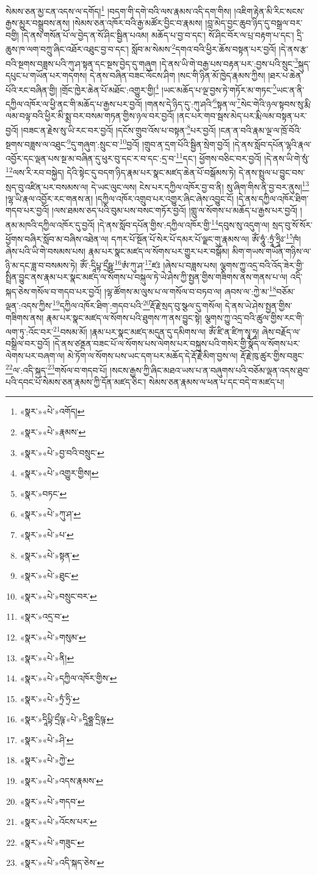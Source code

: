 སེམས་ཅན་མྱ་ངན་འདས་ལ་དགོད།\footnote{«སྣར་»«པེ་»འགོད།} །བདག་གི་དགེ་བའི་ལས་རྣམས་འདི་དག་གིས། །འཇིག་རྟེན་མི་རིང་སངས་རྒྱས་མྱུར་བསྒྲུབས་ནས། །སེམས་ཅན་འཁོར་བའི་རྒྱ་མཚོར་བྱིང་བ་རྣམས། །བླ་མེད་བྱང་ཆུབ་ཉིད་དུ་བསྒྲལ་བར་བགྱི། །དེ་ནས་གསོན་པོ་ལ་བྱེད་ན་སོ་ཤིང་སྦྱིན་པའམ། མཆོད་པ་བྱ་བ་དང་། སོ་ཤིང་བོར་ལ་པྲ་བརྟག་པ་དང་། དྲི་ཆུས་ཁ་ལག་བཀྲུ་ཞིང་འཐོར་འཐུང་བྱ་བ་དང་། སློབ་མ་སེམས་\footnote{«སྣར་»«པེ་»རྣམས་}དགའ་བའི་ཕྱིར་ཆོས་བསྟན་པར་བྱའོ། །དེ་ནས་རྩ་བའི་སྔགས་བཟླས་པའི་ཀུ་ཤ་སྟན་དང་སྔས་བྱེད་དུ་གཞུག །དེ་ནས་ཡི་གེ་བརྒྱ་པས་བརྟན་པར་:བྱས་པའི་སྲུང་\footnote{«སྣར་»«པེ་»བྱ་བའི་བསྲུང་}སྐུད་དཔུང་པ་གཡོན་པར་གདགས། དེ་ནས་བཞིན་བཟང་ལོངས་ཤིག །སང་གི་ཉིན་མོ་ཁྱེད་རྣམས་ཀྱིས། །ཐར་པ་ཆེན་པོའི་རང་བཞིན་གྱི། །གྲོང་ཁྱེར་ཆེན་པོ་མཐོང་:འགྱུར་གྱི།\footnote{«སྣར་»«པེ་»འགྱུར་གྱིས།} །ཡང་མཆོད་པ་ལྔ་བྱས་ཏེ་གཏོར་མ་གཏང་\footnote{«སྣར་»བཏང་}ཡང་ན་ནི་དཀྱིལ་འཁོར་ལ་ཕྱི་ནང་གི་མཆོད་པ་རྒྱས་པར་བྱའོ། །གནས་དེ་ཉིད་དུ་:ཀུ་ཤའི་\footnote{«སྣར་»«པེ་»ཀུ་ཤ་}སྟན་ལ་\footnote{«སྣར་»«པེ་»པ་}སེང་གེའི་ཉལ་སྟབས་སུ་རྨི་ལམ་བལྟ་བའི་ཕྱིར་མི་སྨྲ་བར་བསམ་གཏན་གྱིས་ཉལ་བར་བྱའོ། །ནང་པར་གབ་སྦས་མེད་པར་རྨི་ལམ་བསྟན་པར་བྱའོ། །བཟང་ན་རྗེས་སུ་ཡི་རང་བར་བྱའོ། །དངོས་གྲུབ་འོས་པ་བསྟན་\footnote{«སྣར་»«པེ་»སྟན་}པར་བྱའོ། །ངན་ན་བའི་རྣམ་ལྔ་ལ་ཁྲོ་བོའི་སྔགས་བཟླས་ལ་འཐུང་\footnote{«སྣར་»«པེ་»ཐུང་}དུ་གཞུག་:སྲུང་བ་\footnote{«སྣར་»«པེ་»བསྲུང་བར་}བྱའོ། །གྲུབ་ན་དྲག་པོའི་སྦྱིན་སྲེག་བྱའོ། །དེ་ནས་སློབ་དཔོན་ལྷའི་རྣལ་འབྱོར་དང་ལྡན་པས་སྔ་མ་བཞིན་དུ་ཕུར་བུ་དང་ར་བ་དང་:དྲ་བ་\footnote{«སྣར་»འདྲ་བ་}དང་། ཕྱོགས་བཅིང་བར་བྱའོ། །དེ་ནས་ཡི་གེ་སུཾ་\footnote{«སྣར་»«པེ་»གསུམ་}ལས་རི་རབ་བསྐྱེད། དེའི་སྟེང་དུ་བདག་ཉིད་རྣམ་པར་སྣང་མཛད་ཆེན་པོ་བསྒོམས་ཏེ། དེ་ནས་སྤྲུལ་པ་བྱུང་བས་སྲད་བུ་འཛིན་པར་བསམས་ལ། དེ་ཡང་ལུང་ལས། ངེས་པར་དཀྱིལ་འཁོར་བྱ་བ་ནི། སུ་ཞིག་གིས་ནི་བྱ་བར་ནུས།\footnote{«སྣར་»«པེ་»ནི།} །ལྷ་ཡི་རྣལ་འབྱོར་རང་གནས་ན། །དཀྱིལ་འཁོར་འགྲུབ་པར་འགྱུར་ཞིང་ཞེས་འབྱུང་ངོ། །དེ་ནས་དཀྱིལ་འཁོར་ཐིག་གདབ་པར་བྱའོ། །ལས་ཐམས་ཅད་པའི་བུམ་པས་བསང་གཏོར་བྱའོ། །གླུ་ལ་སོགས་པ་མཆོད་པ་རྒྱས་པར་བྱའོ། །ནམ་མཁའི་དཀྱིལ་འཁོར་དུ་བྱའོ། །དེ་ནས་སློབ་དཔོན་གྱིས་:དཀྱིལ་འཁོར་གྱི་\footnote{«སྣར་»«པེ་»དཀྱིལ་འཁོར་གྱིས་}དབུས་སུ་འདུག་ལ། སྲད་བུ་སོ་སོར་ཕྱོགས་བཞིར་སློབ་མ་བཞིས་འཐེན་ལ། དཀར་པོ་སྔོན་པོ་སེར་པོ་དམར་པོ་ལྗང་གུ་རྣམས་ལ། ཨོཾ་ཧཱུཾ་:ཏྲཱཾ་ཧྲཱིཿ་\footnote{«སྣར་»«པེ་»ཏྲཾ་ཧྲི་}ཁཾ། ཞེས་པའི་ཡི་གེ་བསམས་པས། རྣམ་པར་སྣང་མཛད་ལ་སོགས་པར་གྱུར་པར་བསྒོམ། མིག་གཡས་གཡོན་གཉིས་ལ་ཉི་མ་དང་ཟླ་བ་བསམས་ཏེ། ཨོཾ་:དཱིཔྟ་དྲྀཥྛ་\footnote{«སྣར་»དཱིཔྟི་དྲྀཥྚ་«པེ་»དཱིཤྩྻ་དྲིཥྚ་}ཨཾ་ཀུ་ཤ་\footnote{«སྣར་»«པེ་»ཤི་}ཛཿ །ཞེས་པ་བཟླས་པས། ལྕགས་ཀྱུ་འདྲ་བའི་འོད་ཟེར་གྱི་སྤྲིན་བྱུང་ནས་རྣམ་པར་སྣང་མཛད་ལ་སོགས་པ་བསྐུལ་ཏེ་ཡེ་ཤེས་ཀྱི་སྤྱན་གྱིས་གཟིགས་ནས་གནས་པ་ལ། འདི་སྐད་ཅེས་གསོལ་བ་གདབ་པར་བྱའོ། །ལྷ་ཚོགས་མ་ལུས་པ་ལ་གསོལ་བ་བཏབ་ལ། ཞབས་ལ་:ཀྱེ་མ་\footnote{«སྣར་»«པེ་»ཀྱེ་}བཅོམ་ལྡན་:འདས་ཀྱིས་\footnote{«སྣར་»«པེ་»འདས་རྣམས་}དཀྱིལ་འཁོར་ཐིག་:གདབ་པའི་\footnote{«སྣར་»«པེ་»གདབ་}རྡོ་རྗེ་སྲད་བུ་སྩལ་དུ་གསོལ། དེ་ནས་ཡེ་ཤེས་སྤྱན་གྱིས་གཟིགས་ནས། རྣམ་པར་སྣང་མཛད་ལ་སོགས་པའི་ཐུགས་ཀ་ནས་བྱུང་སྟེ། ལྕགས་ཀྱུ་འདྲ་བའི་ཚུལ་གྱིས་རང་གི་ལག་ཏུ་:འོང་བར་\footnote{«སྣར་»«པེ་»འོངས་པར་}བསམ་མོ། །རྣམ་པར་སྣང་མཛད་མདུན་དུ་དམིགས་ལ། ཨོཾ་ཛི་ན་ཛིཀ་སྭཱ་ཧཱ། ཞེས་བརྗོད་ལ་བསྒྲིལ་བར་བྱའོ། །དེ་ནས་ཙནྡན་བཟང་པོ་ལ་སོགས་པས་ལེགས་པར་བསྐུས་པའི་གསེར་གྱི་སྣོད་ལ་སོགས་པར་ལེགས་པར་བཞག་ལ། མེ་ཏོག་ལ་སོགས་པས་ཡང་དག་པར་མཆོད་དེ་རྡོ་རྗེ་མིག་བྱས་ལ། རྡོ་རྗེ་ཁུ་ཚུར་གྱིས་བཟུང་\footnote{«སྣར་»«པེ་»གཟུང་}ལ་:འདི་སྐད་\footnote{«སྣར་»«པེ་»འདི་སྐད་ཅེས་}གསོལ་བ་གདབ་པོ། །སངས་རྒྱས་ཀྱི་ཞིང་མཐའ་ཡས་པ་ན་བཞུགས་པའི་བཅོམ་ལྡན་འདས་ཐུབ་པའི་དབང་པོ་སེམས་ཅན་རྣམས་ཀྱི་དོན་མཛད་ཅིང་། སེམས་ཅན་རྣམས་ལ་ཕན་པ་དང་བདེ་བ་མཛད་པ། 
